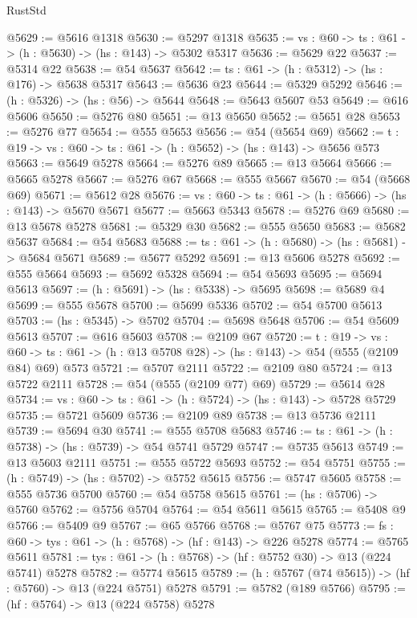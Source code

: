 \begin{lexlean}{RustStd}
\begin{coremodule}
@5629 := @5616 @1318
@5630 := @5297 @1318
@5635 := {vs : @60} -> {ts : @61} -> (h : @5630) -> (hs : @143) -> @5302 @5317
@5636 := @5629 @22
@5637 := @5314 @22
@5638 := @54 @5637
@5642 := {ts : @61} -> (h : @5312) -> (hs : @176) -> @5638 @5317
@5643 := @5636 @23
@5644 := @5329 @5292
@5646 := (h : @5326) -> (hs : @56) -> @5644
@5648 := @5643 @5607 @53
@5649 := @616 @5606
@5650 := @5276 @80
@5651 := @13 @5650
@5652 := @5651 @28
@5653 := @5276 @77
@5654 := @555 @5653
@5656 := @54 (@5654 @69)
@5662 := {t : @19} -> {vs : @60} -> {ts : @61} -> (h : @5652) -> (hs : @143) -> @5656 @573
@5663 := @5649 @5278
@5664 := @5276 @89
@5665 := @13 @5664
@5666 := @5665 @5278
@5667 := @5276 @67
@5668 := @555 @5667
@5670 := @54 (@5668 @69)
@5671 := @5612 @28
@5676 := {vs : @60} -> {ts : @61} -> (h : @5666) -> (hs : @143) -> @5670 @5671
@5677 := @5663 @5343
@5678 := @5276 @69
@5680 := @13 @5678 @5278
@5681 := @5329 @30
@5682 := @555 @5650
@5683 := @5682 @5637
@5684 := @54 @5683
@5688 := {ts : @61} -> (h : @5680) -> (hs : @5681) -> @5684 @5671
@5689 := @5677 @5292
@5691 := @13 @5606 @5278
@5692 := @555 @5664
@5693 := @5692 @5328
@5694 := @54 @5693
@5695 := @5694 @5613
@5697 := (h : @5691) -> (hs : @5338) -> @5695
@5698 := @5689 @4
@5699 := @555 @5678
@5700 := @5699 @5336
@5702 := @54 @5700 @5613
@5703 := (hs : @5345) -> @5702
@5704 := @5698 @5648
@5706 := @54 @5609 @5613
@5707 := @616 @5603
@5708 := @2109 @67
@5720 := {t : @19} ->
  {vs : @60} -> {ts : @61} -> (h : @13 @5708 @28) -> (hs : @143) -> @54 (@555 (@2109 @84) @69) @573
@5721 := @5707 @2111
@5722 := @2109 @80
@5724 := @13 @5722 @2111
@5728 := @54 (@555 (@2109 @77) @69)
@5729 := @5614 @28
@5734 := {vs : @60} -> {ts : @61} -> (h : @5724) -> (hs : @143) -> @5728 @5729
@5735 := @5721 @5609
@5736 := @2109 @89
@5738 := @13 @5736 @2111
@5739 := @5694 @30
@5741 := @555 @5708 @5683
@5746 := {ts : @61} -> (h : @5738) -> (hs : @5739) -> @54 @5741 @5729
@5747 := @5735 @5613
@5749 := @13 @5603 @2111
@5751 := @555 @5722 @5693
@5752 := @54 @5751
@5755 := (h : @5749) -> (hs : @5702) -> @5752 @5615
@5756 := @5747 @5605
@5758 := @555 @5736 @5700
@5760 := @54 @5758 @5615
@5761 := (hs : @5706) -> @5760
@5762 := @5756 @5704
@5764 := @54 @5611 @5615
@5765 := @5408 @9
@5766 := @5409 @9
@5767 := @65 @5766
@5768 := @5767 @75
@5773 := {fs : @60} -> {tys : @61} -> (h : @5768) -> (hf : @143) -> @226 @5278
@5774 := @5765 @5611
@5781 := {tys : @61} -> (h : @5768) -> (hf : @5752 @30) -> @13 (@224 @5741) @5278
@5782 := @5774 @5615
@5789 := (h : @5767 (@74 @5615)) -> (hf : @5760) -> @13 (@224 @5751) @5278
@5791 := @5782 (@189 @5766)
@5795 := (hf : @5764) -> @13 (@224 @5758) @5278

\end{coremodule}
\end{lexlean}
